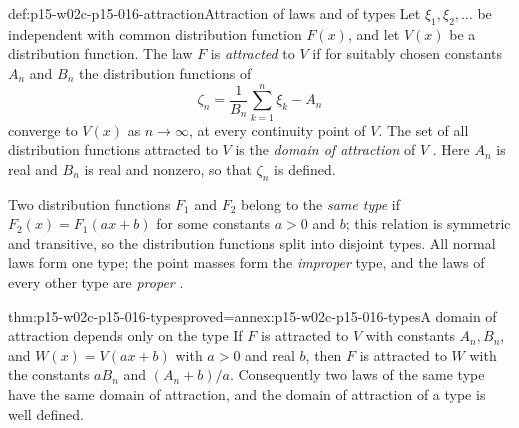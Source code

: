 \begin{hbdefinition}{def:p15-w02c-p15-016-attraction}{Attraction of laws and of types}
Let \(\xi_1,\xi_2,\ldots\) be independent with common distribution
function \(F(x)\), and let \(V(x)\) be a distribution function. The
law \(F\) is \emph{attracted} to \(V\) if for suitably chosen
constants \(A_n\) and \(B_n\) the distribution functions of
\[
 \zeta_n=\frac1{B_n}\sum_{k=1}^n\xi_k-A_n
\]
converge to \(V(x)\) as \(n\to\infty\), at every continuity point of
\(V\). The set of all distribution functions attracted to \(V\) is the
\emph{domain of attraction} of \(V\)
\cite[Section~35, pp.~171--172]{GnedenkoKolmogorov1954LimitDistributions}.
Here \(A_n\) is real and \(B_n\) is real and nonzero, so that
\(\zeta_n\) is defined.

Two distribution functions \(F_1\) and \(F_2\) belong to the
\emph{same type} if \(F_2(x)=F_1(ax+b)\) for some constants \(a>0\)
and \(b\); this relation is symmetric and transitive, so the
distribution functions split into disjoint types. All normal laws form
one type; the point masses form the \emph{improper} type, and the
laws of every other type are \emph{proper}
\cite[p.~40]{GnedenkoKolmogorov1954LimitDistributions}.
\end{hbdefinition}

\begin{hblemma}{thm:p15-w02c-p15-016-types}{proved=annex:p15-w02c-p15-016-types}{A domain of attraction depends only on the type}
If \(F\) is attracted to \(V\) with constants \(A_n,B_n\), and
\(W(x)=V(ax+b)\) with \(a>0\) and real \(b\), then \(F\) is attracted
to \(W\) with the constants \(aB_n\) and \((A_n+b)/a\). Consequently
two laws of the same type have the same domain of attraction, and the
domain of attraction of a type is well defined.
\end{hblemma}

